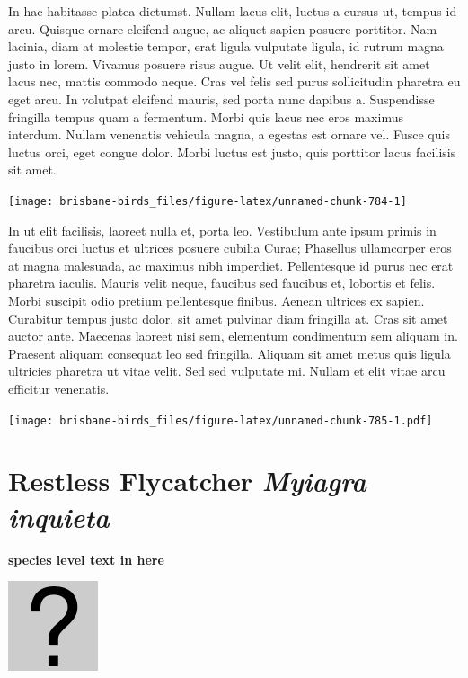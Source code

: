 \documentclass[]{book}
\let\origfigure\figure
\let\endorigfigure\endfigure
\renewenvironment{figure}[1][2] {
  \expandafter\origfigure\expandafter[H]
} {
  \endorigfigure
}
\begin{document}
In hac habitasse platea dictumst. Nullam lacus elit, luctus a cursus ut,
tempus id arcu. Quisque ornare eleifend augue, ac aliquet sapien posuere
porttitor. Nam lacinia, diam at molestie tempor, erat ligula vulputate
ligula, id rutrum magna justo in lorem. Vivamus posuere risus augue. Ut
velit elit, hendrerit sit amet lacus nec, mattis commodo neque. Cras vel
felis sed purus sollicitudin pharetra eu eget arcu. In volutpat eleifend
mauris, sed porta nunc dapibus a. Suspendisse fringilla tempus quam a
fermentum. Morbi quis lacus nec eros maximus interdum. Nullam venenatis
vehicula magna, a egestas est ornare vel. Fusce quis luctus orci, eget
congue dolor. Morbi luctus est justo, quis porttitor lacus facilisis sit
amet.

\begin{figure}
\texttt{[image: brisbane-birds\_files/figure-latex/unnamed-chunk-784-1]} \caption{insert figure caption}\label{fig:unnamed-chunk-784}
\end{figure}

In ut elit facilisis, laoreet nulla et, porta leo. Vestibulum ante ipsum
primis in faucibus orci luctus et ultrices posuere cubilia Curae;
Phasellus ullamcorper eros at magna malesuada, ac maximus nibh
imperdiet. Pellentesque id purus nec erat pharetra iaculis. Mauris velit
neque, faucibus sed faucibus et, lobortis et felis. Morbi suscipit odio
pretium pellentesque finibus. Aenean ultrices ex sapien. Curabitur
tempus justo dolor, sit amet pulvinar diam fringilla at. Cras sit amet
auctor ante. Maecenas laoreet nisi sem, elementum condimentum sem
aliquam in. Praesent aliquam consequat leo sed fringilla. Aliquam sit
amet metus quis ligula ultricies pharetra ut vitae velit. Sed sed
vulputate mi. Nullam et elit vitae arcu efficitur venenatis.

\begin{figure}
\centering
\texttt{[image: brisbane-birds\_files/figure-latex/unnamed-chunk-785-1.pdf]}
\caption{\label{fig:unnamed-chunk-785}insert figure caption}
\end{figure}

\section{\texorpdfstring{Restless Flycatcher \emph{Myiagra
inquieta}}{Restless Flycatcher Myiagra inquieta}}\label{restless-flycatcher-myiagra-inquieta}

\textbf{species level text in here}

\begin{figure}
\centering
\includegraphics{assets/missing.png}
\caption{No image for species}
\end{figure}
\end{document}
